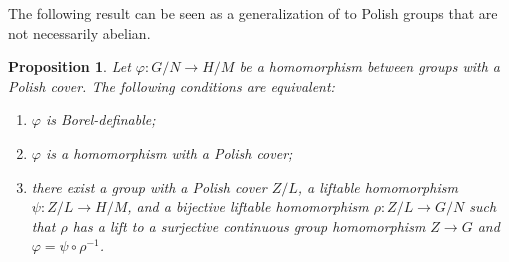 \documentclass[12pt]{amsart}
\newtheorem{proposition}[theorem]{Proposition}
\theoremstyle{definition}
\begin{document}
The following result can be seen as a generalization of \cite[Theorem 4.6]%
{lupini_looking_2024} to Polish groups that are not necessarily abelian.

\begin{proposition}
\label{prop:borel-graph} Let $\varphi :G/N\rightarrow H/M$ be a homomorphism
between groups with a Polish cover. The following conditions are equivalent:

\begin{enumerate}
\item $\varphi $ is Borel-definable;

\item $\varphi $ is a homomorphism with a Polish cover;

\item there exist a group with a Polish cover $Z/L$, a liftable homomorphism 
$\psi :Z/L\rightarrow H/M$, and a bijective liftable homomorphism $\rho
:Z/L\rightarrow G/N$ such that $\rho $ has a lift to a surjective continuous
group homomorphism $Z\rightarrow G$ and $\varphi =\psi \circ \rho ^{-1}$.
\end{enumerate}
\end{proposition}
\end{document}
